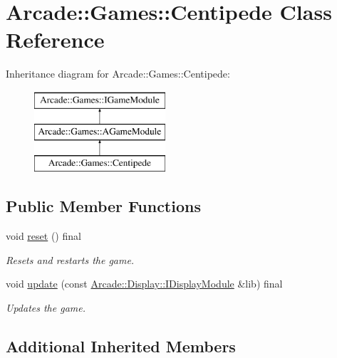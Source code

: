 \hypertarget{classArcade_1_1Games_1_1Centipede}{}\section{Arcade\+::Games\+::Centipede Class Reference}
\label{classArcade_1_1Games_1_1Centipede}
Inheritance diagram for Arcade\+::Games\+::Centipede\+:\begin{figure}[H]
\begin{center}
\leavevmode
\includegraphics[height=3.000000cm]{classArcade_1_1Games_1_1Centipede}
\end{center}
\end{figure}
\subsection*{Public Member Functions}
\begin{DoxyCompactItemize}
\item 
\mbox{\label{classArcade_1_1Games_1_1Centipede_af32b470589322a425db91cf61d5d5c18}} 
void \mbox{\hyperlink{classArcade_1_1Games_1_1Centipede_af32b470589322a425db91cf61d5d5c18}{reset}} () final
\begin{DoxyCompactList}\small\item\em Resets and restarts the game. \end{DoxyCompactList}\item 
void \mbox{\hyperlink{classArcade_1_1Games_1_1Centipede_a11a932a0abda301ae6037c6b97532e79}{update}} (const \mbox{\hyperlink{classArcade_1_1Display_1_1IDisplayModule}{Arcade\+::\+Display\+::\+I\+Display\+Module}} \&lib) final
\begin{DoxyCompactList}\small\item\em Updates the game. \end{DoxyCompactList}\end{DoxyCompactItemize}
\subsection*{Additional Inherited Members}


